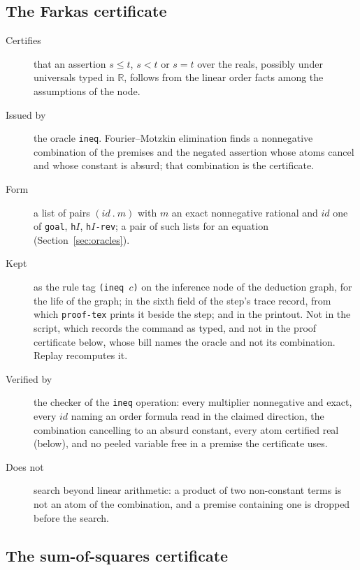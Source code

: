 \subsection{The Farkas certificate}

\begin{description}
\item[Certifies] that an assertion $s \le t$, $s < t$ or $s = t$ over the
  reals, possibly under universals typed in $\mathbb{R}$, follows from the
  linear order facts among the assumptions of the node.
\item[Issued by] the oracle \texttt{ineq}.  Fourier--Motzkin elimination
  finds a nonnegative combination of the premises and the negated
  assertion whose atoms cancel and whose constant is absurd; that
  combination is the certificate.
\item[Form] a list of pairs $(\mathit{id}\ .\ m)$ with $m$ an exact
  nonnegative rational and $\mathit{id}$ one of \texttt{goal},
  \texttt{h}$I$, \texttt{h}$I$\texttt{-rev}; a pair of such lists for an
  equation (Section~\ref{sec:oracles}).
\item[Kept] as the rule tag \texttt{(ineq $c$)} on the inference node of
  the deduction graph, for the life of the graph; in the sixth field of the
  step's trace record, from which \texttt{proof-tex} prints it beside the
  step; and in the printout.  Not in the script, which records the command
  as typed, and not in the proof certificate below, whose bill names the
  oracle and not its combination.  Replay recomputes it.
\item[Verified by] the checker of the \texttt{ineq} operation: every
  multiplier nonnegative and exact, every $\mathit{id}$ naming an order
  formula read in the claimed direction, the combination cancelling to an
  absurd constant, every atom certified real (below), and no peeled
  variable free in a premise the certificate uses.
\item[Does not] search beyond linear arithmetic: a product of two
  non-constant terms is not an atom of the combination, and a premise
  containing one is dropped before the search.
\end{description}

\subsection{The sum-of-squares certificate}

